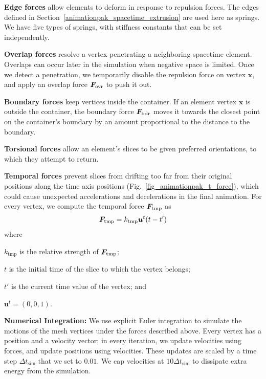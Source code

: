 \newtext
{
\textbf{Edge forces}
allow elements to deform in response to repulsion forces.
The edges defined in Section~\ref{animationpak_spacetime_extrusion} are used here as springs.
We have five types of springs, with stiffness constants that can be 
set independently.
}

\newtext
{
\textbf{Overlap forces} resolve a vertex penetrating a
neighboring spacetime element.
Overlaps can occur later in the simulation when negative space is 
limited.  Once we detect a penetration,  
we temporarily disable the repulsion force on vertex $\bm{x}$, and apply
an overlap force $\bm{F}_\mathrm{ovr}$ to push it out.
}

\newtext
{
\textbf{Boundary forces} keep vertices inside the container.
If an element vertex $\bm{x}$
is outside the container, the boundary force $\bm{F}_\mathrm{bdr}$ moves
it towards the closest point
on the container's boundary by an amount proportional to the distance to
the boundary.
}

\newtext
{
\textbf{Torsional forces} allow an element's slices to be given
preferred orientations, to which they attempt to return.
}

\newtext
{
\textbf{Temporal forces} prevent slices from drifting too far
from their original positions along the time axis positions
(Fig.~\ref{fig_animationpak_t_force}), which could cause unexpected accelerations
and decelerations in the final animation.  For every vertex, we compute
the temporal force $\bm{F}_\mathrm{tmp}$ as
\begin{equation}
\bm{F}_\mathrm{tmp} = k_\mathrm{tmp} \bm{u}^t(t - t')
\end{equation}
where
\begin{packeddescriptions}
  \item[$k_\mathrm{tmp}$] is the relative strength of $\bm{F}_\mathrm{tmp}$;
  \item[$t$] is the initial time of the slice to which the vertex belongs;
  \item[$t'$] is the current time value of the vertex; and
  \item[$\bm{u}^t = (0,0,1)$.]
\end{packeddescriptions}
}



\newtext
{
\textbf{Numerical Integration:}
We use explicit Euler integration to simulate the motions of the mesh vertices under the
forces described above.  Every vertex has a position and a velocity vector; in
every iteration, we update velocities using forces, and update positions using
velocities.  These updates are scaled by a time step 
$\Delta t_\mathrm{sim}$ that we set to $0.01$.
We cap velocities at $10 \Delta t_\mathrm{sim}$ 
to dissipate extra energy from the simulation.
}


